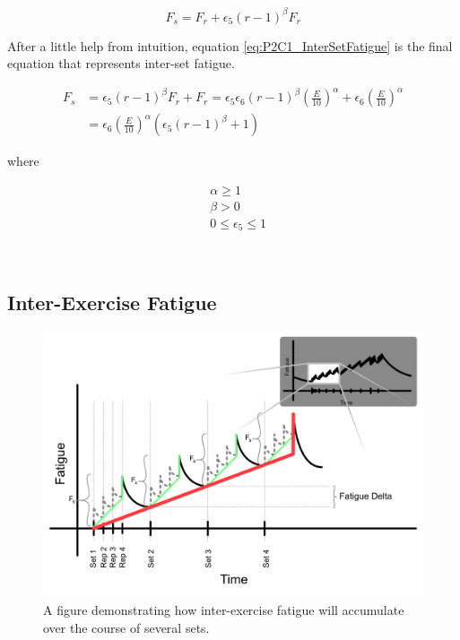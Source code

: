 \begin{equation*}
	F_s =
	F_{r} + \epsilon_5 (r-1)^\beta F_r
\end{equation*}

After a little help from intuition, equation \ref{eq:P2C1_InterSetFatigue} is the final equation that represents inter-set fatigue.

\begin{minipage}{\textwidth}
	\begin{equation}
		\label{eq:P2C1_InterSetFatigue}
		\begin{split}
			F_s & = \epsilon_5 (r-1) ^ \beta F_r + F_r
			= \epsilon_5 \epsilon_6 (r-1)^\beta \left( 
				\frac{E}{10} 
			\right)^\alpha
			+ \epsilon_6 \left( \frac{E}{10} \right)^\alpha
			\\
			& = 
			\epsilon_6 \left( \frac{E}{10} \right)^\alpha
			\left(
				\epsilon_5 (r-1)^\beta + 1
			\right)
		\end{split}
	\end{equation}
	\centerline{where}
	\begin{equation*}
		\begin{split}
		    & \alpha \ge 1 \\
		    & \beta > 0 \\
			& 0 \le \epsilon_5 \le 1
		\end{split}
	\end{equation*}
\end{minipage}\\

\subsection{Inter-Exercise Fatigue}
\label{sec:P2C1_InterExerciseFatigue}

\begin{figure}[htb]
    \centering
    \includegraphics[scale=0.55]{images/p2/ch1/InterExerciseFatigue.png}
    \caption{A figure demonstrating how inter-exercise fatigue will accumulate over the course of several sets.}
    \label{fig:P2C1_InterExerciseFatigue}
\end{figure}

